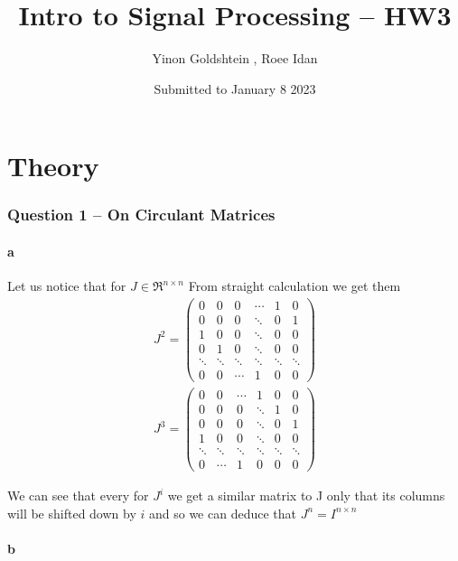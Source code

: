 \documentclass[english]{extarticle}
\numberwithin{equation}{section}
\numberwithin{figure}{section}
\begin{document}
\title{Intro to Signal Processing -- HW3}
\author{Yinon Goldshtein , Roee Idan}
\date{Submitted to January 8 2023}
\maketitle

\part{Theory}

\section*{Question 1 -- On Circulant Matrices}

\subsection*{a}
Let us notice that for $J \in \Re^{n \times n}$ From straight calculation we get them
\begin{align}
    J^{2} = \begin{pmatrix} 0 & 0 & 0 & \cdots & 1 & 0\\ 0 & 0 & 0 & \ddots & 0 & 1 \\
    1 & 0 & 0 & \ddots & 0 & 0 \\ 0 & 1 & 0 & \ddots & 0 & 0 \\ \ddots & \ddots & \ddots & \ddots & \ddots & \ddots \\ 0 & 0 & \cdots & 1 & 0 & 0\end{pmatrix}
\end{align}
\begin{align}
    J^{3} = \begin{pmatrix} 0 & 0  & \cdots & 1 & 0 & 0\\ 0 & 0 & 0 & \ddots & 1 & 0 \\
    0 & 0 & 0 & \ddots & 0 & 1 \\ 1 & 0 & 0 & \ddots & 0 & 0 \\ \ddots & \ddots & \ddots & \ddots & \ddots & \ddots \\ 0 & \cdots & 1 & 0 & 0 & 0\end{pmatrix}
\end{align}

We can see that every for $J^{i}$ we get a similar matrix to J only that its columns will be shifted down by $i$ and so we can deduce that $J^{n}= I^{n \times n}$
\subsection*{b}
\end{document}

